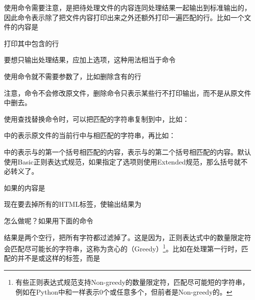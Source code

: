使用命令需要注意，是把待处理文件的内容连同处理结果一起输出到标准输出的，因此命令表示除了把文件内容打印出来之外还额外打印一遍匹配的行。比如一个文件的内容是




打印其中包含的行




要想只输出处理结果，应加上选项，这种用法相当于命令




使用命令就不需要参数了，比如删除含有的行




注意，命令不会修改原文件，删除命令只表示某些行不打印输出，而不是从原文件中删去。



使用查找替换命令时，可以把匹配的字符串复制到中，比如：




中的\BookCode{\&}表示原文件的当前行中与相匹配的字符串，再比如：




中的表示与的第一个\BookCode{(\BookSplit{})\BookSplit{}}括号相匹配的内容，表示与的第二个\BookCode{(\BookSplit{})\BookSplit{}}括号相匹配的内容。默认使用Basic正则表达式规范，如果指定了选项则使用Extended规范，那么\BookCode{(\BookSplit{})\BookSplit{}}括号就不必转义了。



如果的内容是




现在要去掉所有的HTML标签，使输出结果为




怎么做呢？如果用下面的命令




结果是两个空行，把所有字符都过滤掉了。这是因为，正则表达式中的数量限定符会匹配尽可能长的字符串，这称为贪心的（Greedy）\footnote[39]{有些正则表达式规范支持Non-greedy的数量限定符，匹配尽可能短的字符串，例如在Python中和\BookCode{*}一样表示0个或任意多个，但前者是Non-greedy的。}。比如在处理第一行时，匹配的并不是或这样的标签，而是


